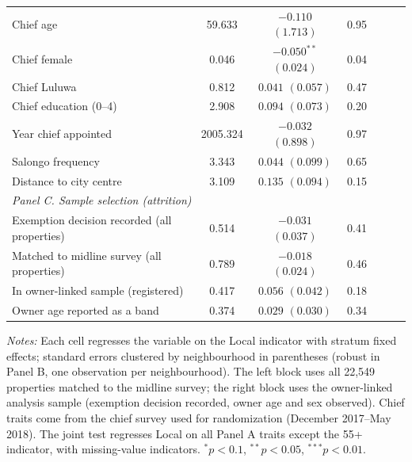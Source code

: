 \begin{table}[!htbp]
\begin{threeparttable}
\begin{tabular}{lcccccc}
Chief age & 59.633 & $-0.110$ $(1.713)$ & 0.95 &  &  &  \\
Chief female & 0.046 & $-0.050^{**}$ $(0.024)$ & 0.04 &  &  &  \\
Chief Luluwa & 0.812 & $0.041$ $(0.057)$ & 0.47 &  &  &  \\
Chief education (0--4) & 2.908 & $0.094$ $(0.073)$ & 0.20 &  &  &  \\
Year chief appointed & 2005.324 & $-0.032$ $(0.898)$ & 0.97 &  &  &  \\
Salongo frequency & 3.343 & $0.044$ $(0.099)$ & 0.65 &  &  &  \\
Distance to city centre & 3.109 & $0.135$ $(0.094)$ & 0.15 &  &  &  \\
\midrule
\multicolumn{7}{l}{\textit{Panel C. Sample selection (attrition)}} \\
Exemption decision recorded (all properties) & 0.514 & $-0.031$ $(0.037)$ & 0.41 &  &  &  \\
Matched to midline survey (all properties) & 0.789 & $-0.018$ $(0.024)$ & 0.46 &  &  &  \\
In owner-linked sample (registered) & 0.417 & $0.056$ $(0.042)$ & 0.18 &  &  &  \\
Owner age reported as a band & 0.374 & $0.029$ $(0.030)$ & 0.34 &  &  &  \\
\bottomrule
\end{tabular}
\begin{tablenotes}[flushleft]\scriptsize
\item \textit{Notes:} Each cell regresses the variable on the Local indicator with stratum fixed effects; standard errors clustered by neighbourhood in parentheses (robust in Panel B, one observation per neighbourhood). The left block uses all 22,549 properties matched to the midline survey; the right block uses the owner-linked analysis sample (exemption decision recorded, owner age and sex observed). Chief traits come from the chief survey used for randomization (December 2017--May 2018). The joint test regresses Local on all Panel A traits except the 55+ indicator, with missing-value indicators. $^{*}p<0.1$, $^{**}p<0.05$, $^{***}p<0.01$.
\end{tablenotes}
\end{threeparttable}
\end{table}